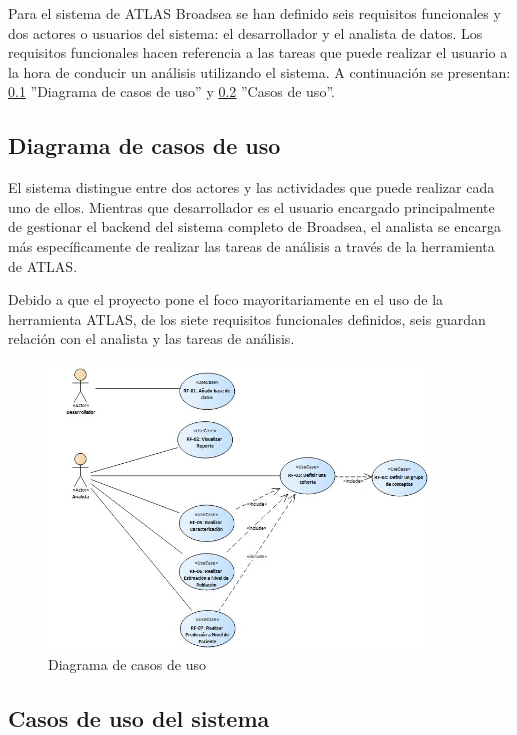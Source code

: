 Para el sistema de ATLAS Broadsea se han definido seis requisitos funcionales y dos actores o usuarios del sistema: el desarrollador y el analista de datos. Los requisitos funcionales hacen referencia a las tareas que puede realizar el usuario a la hora de conducir un análisis utilizando el sistema. A continuación se presentan: \ref{subsec:06FRdiagrama} ''Diagrama de casos de uso'' y \ref{subsec:06casosUso} ''Casos de uso''.

\subsection{Diagrama de casos de uso} \label{subsec:06FRdiagrama}

El sistema distingue entre dos actores y las actividades que puede realizar cada uno de ellos. Mientras que desarrollador es el usuario encargado principalmente de gestionar el backend del sistema completo de Broadsea, el analista se encarga más específicamente de realizar las tareas de análisis a través de la herramienta de ATLAS. 

Debido a que el proyecto pone el foco mayoritariamente en el uso de la herramienta ATLAS, de los siete requisitos funcionales definidos, seis guardan relación con el analista y las tareas de análisis.


\begin{figure}[H]
    \centering
    \includegraphics[width=0.90\textwidth]{figures/FRdiagram.jpg}
    \caption{Diagrama de casos de uso}
    \label{fig:FRdiagram}
\end{figure}

\subsection{Casos de uso del sistema} \label{subsec:06casosUso}


